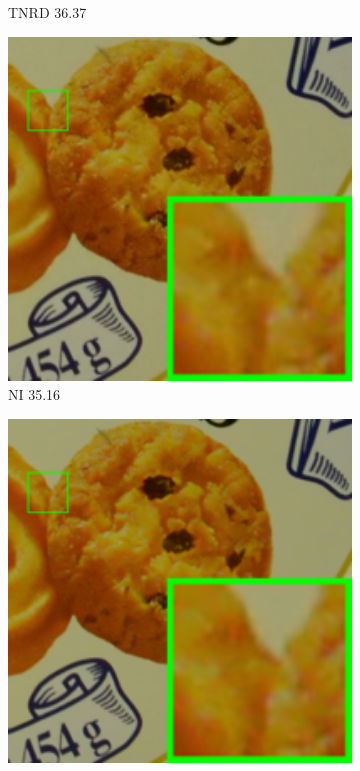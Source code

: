 \begin{figure}
\begin{subfigure}[t]{0.19\textwidth}
\caption{TNRD 36.37}
    \end{subfigure}
    \hfill
    \begin{subfigure}[t]{0.19\textwidth}
        \centering
        \includegraphics[width=1\textwidth]{images/mcwnnm/cc/resize_br_NI_CC15_d600_iso3200_2.png}
\caption{NI 35.16}
    \end{subfigure}
\hfill
    \begin{subfigure}[t]{0.19\textwidth}
        \centering
        \includegraphics[width=1\textwidth]{images/mcwnnm/cc/resize_br_NC_CC15_d600_iso3200_2.png}

\end{subfigure}
\end{figure}
